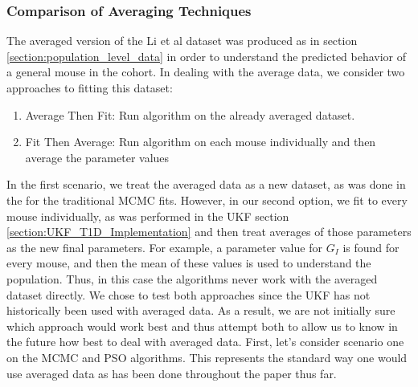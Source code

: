 \documentclass{article}
\begin{document}
\subsubsection{Comparison of Averaging Techniques}
The averaged version of the Li et al dataset was produced as in section \ref{section:population_level_data} in order to understand the predicted behavior of a general mouse in the cohort. In dealing with the average data, we consider two approaches to fitting this dataset:
\begin{enumerate}
    \item Average Then Fit: Run algorithm on the already averaged dataset.
    \item Fit Then Average: Run algorithm on each mouse individually and then average the parameter values
\end{enumerate}
In the first scenario, we treat the averaged data as a new dataset, as was done in the for the traditional MCMC fits. However, in our second option, we fit to every mouse individually, as was performed in the UKF section \ref{section:UKF_T1D_Implementation} and then treat averages of those parameters as the new final parameters. For example, a parameter value for $G_I$ is found for every mouse, and then the mean of these values is used to understand the population. Thus, in this case the algorithms never work with the averaged dataset directly. We chose to test both approaches since the UKF has not historically been used with averaged data. As a result, we are not initially sure which approach would work best and thus attempt both to allow us to know in the future how best to deal with averaged data. First, let's consider scenario one on the MCMC and PSO algorithms. This represents the standard way one would use averaged data as has been done throughout the paper thus far.


\end{document}
